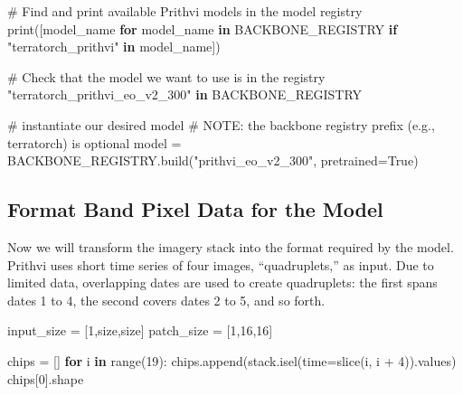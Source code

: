 \documentclass[
  letterpaper,
  DIV=11,
  numbers=noendperiod]{scrreprt}
\newenvironment{Shaded}{\begin{snugshade}}{\end{snugshade}}
\newcommand{\AlertTok}[1]{\textcolor[rgb]{0.68,0.00,0.00}{#1}}
\newcommand{\BuiltInTok}[1]{\textcolor[rgb]{0.00,0.23,0.31}{#1}}
\newcommand{\CommentTok}[1]{\textcolor[rgb]{0.37,0.37,0.37}{#1}}
\newcommand{\ControlFlowTok}[1]{\textcolor[rgb]{0.00,0.23,0.31}{\textbf{#1}}}
\newcommand{\DecValTok}[1]{\textcolor[rgb]{0.68,0.00,0.00}{#1}}
\newcommand{\KeywordTok}[1]{\textcolor[rgb]{0.00,0.23,0.31}{\textbf{#1}}}
\newcommand{\NormalTok}[1]{\textcolor[rgb]{0.00,0.23,0.31}{#1}}
\newcommand{\OperatorTok}[1]{\textcolor[rgb]{0.37,0.37,0.37}{#1}}
\newcommand{\StringTok}[1]{\textcolor[rgb]{0.13,0.47,0.30}{#1}}
\newcommand{\VariableTok}[1]{\textcolor[rgb]{0.07,0.07,0.07}{#1}}
\begin{document}
\begin{Shaded}
\begin{Highlighting}[]
\CommentTok{\# Find and print available Prithvi models in the model registry}
\BuiltInTok{print}\NormalTok{([model\_name }\ControlFlowTok{for}\NormalTok{ model\_name }\KeywordTok{in}\NormalTok{ BACKBONE\_REGISTRY }\ControlFlowTok{if} \StringTok{"terratorch\_prithvi"} \KeywordTok{in}\NormalTok{ model\_name])}

\CommentTok{\# Check that the model we want to use is in the registry}
\CommentTok{"terratorch\_prithvi\_eo\_v2\_300"} \KeywordTok{in}\NormalTok{ BACKBONE\_REGISTRY}

\CommentTok{\# instantiate our desired model}
\CommentTok{\# }\AlertTok{NOTE}\CommentTok{: the backbone registry prefix (e.g., \textasciigrave{}terratorch\textasciigrave{}) is optional}
\NormalTok{model }\OperatorTok{=}\NormalTok{ BACKBONE\_REGISTRY.build(}\StringTok{"prithvi\_eo\_v2\_300"}\NormalTok{, pretrained}\OperatorTok{=}\VariableTok{True}\NormalTok{)}
\end{Highlighting}
\end{Shaded}

\subsection{Format Band Pixel Data for the
Model}\label{format-band-pixel-data-for-the-model}

Now we will transform the imagery stack into the format required by the
model. Prithvi uses short time series of four images, ``quadruplets,''
as input. Due to limited data, overlapping dates are used to create
quadruplets: the first spans dates 1 to 4, the second covers dates 2 to
5, and so forth.

\begin{Shaded}
\begin{Highlighting}[]
\NormalTok{input\_size }\OperatorTok{=}\NormalTok{ [}\DecValTok{1}\NormalTok{,size,size]}
\NormalTok{patch\_size }\OperatorTok{=}\NormalTok{ [}\DecValTok{1}\NormalTok{,}\DecValTok{16}\NormalTok{,}\DecValTok{16}\NormalTok{]}
\end{Highlighting}
\end{Shaded}

\begin{Shaded}
\begin{Highlighting}[]
\NormalTok{chips }\OperatorTok{=}\NormalTok{ []}
\ControlFlowTok{for}\NormalTok{ i }\KeywordTok{in} \BuiltInTok{range}\NormalTok{(}\DecValTok{19}\NormalTok{):}
\NormalTok{    chips.append(stack.isel(time}\OperatorTok{=}\BuiltInTok{slice}\NormalTok{(i, i }\OperatorTok{+} \DecValTok{4}\NormalTok{)).values)}
\NormalTok{chips[}\DecValTok{0}\NormalTok{].shape}
\end{Highlighting}
\end{Shaded}
\end{document}
